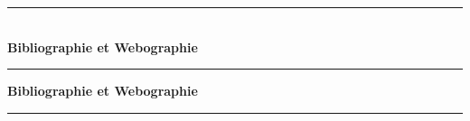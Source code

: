 
\clearpage
\thispagestyle{empty}
\vspace*{\fill}
\begin{center}
  {\color{wcgold}\rule{0.75\linewidth}{3pt}}\\[1.8cm]
  {\LARGE\sffamily\bfseries\textcolor{emsigreen}{Bibliographie et Webographie}}\\[1.8cm]
  {\color{wcgold}\rule{0.75\linewidth}{3pt}}
\end{center}
\vspace*{\fill}
\clearpage
{}

{\noindent\LARGE\sffamily\bfseries\textcolor{emsigreen}{Bibliographie et Webographie}}\par
\vspace{0.2cm}
{\noindent\color{wcgold}\rule{\linewidth}{1.2pt}}\par
\vspace{0.5cm}

